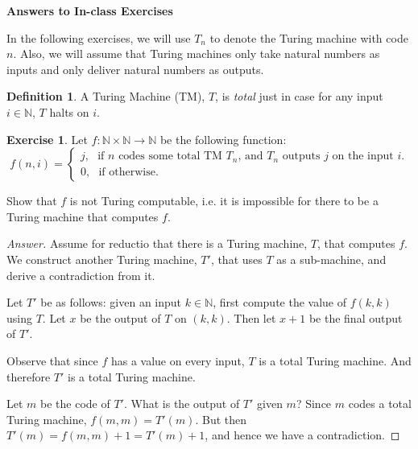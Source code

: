 \documentclass[11pt]{article}
\theoremstyle{definition}
\newtheorem{defn}{Definition}
\newtheorem{exer}{Exercise}
\begin{document}




\begin{center}
{\LARGE \bf Answers to In-class Exercises}
\end{center}

\smallskip


In the following exercises, we will use $T_n$ to denote the Turing machine with code $n$. Also, we will assume that Turing machines only take natural numbers as inputs and only deliver natural numbers as outputs.

\begin{defn}
A Turing Machine (TM), $T$, is \textit{total} just in case for any input $i \in \mathbb{N}$, $T$ halts on $i$. 
\end{defn}

\begin{exer}
Let $f: \mathbb{N} \times \mathbb{N} \rightarrow \mathbb{N}$ be the following function:
$$
f(n, i) = 
\begin{cases}
j, \, \, \, \, \text{if $n$ codes some total TM $T_n$, and $T_n$ outputs $j$ on the input $i$.} \\
0, \, \, \, \, \text{if otherwise.}
\end{cases}
$$

Show that $f$ is not Turing computable, i.e. it is impossible for there to be a Turing machine that computes $f$.
\end{exer}

\begin{proof}[Answer]
Assume for reductio that there is a Turing machine, $T$, that computes $f$. We construct another Turing machine, $T'$, that uses $T$ as a sub-machine, and derive a contradiction from it.

Let $T'$ be as follows: given an input $k \in \mathbb{N}$, first compute the value of $f(k, k)$ using $T$. Let $x$ be the output of $T$ on $(k, k)$. Then let $x+1$ be the final output of $T'$.

Observe that since $f$ has a value on every input, $T$ is a total Turing machine. And therefore $T'$ is a total Turing machine.

Let $m$ be the code of $T'$. What is the output of $T'$ given $m$? Since $m$ codes a total Turing machine, $f(m, m) = T'(m)$. But then $T'(m) = f(m, m)+1 = T'(m)+1$, and hence we have a contradiction.

\end{proof}
\end{document}
